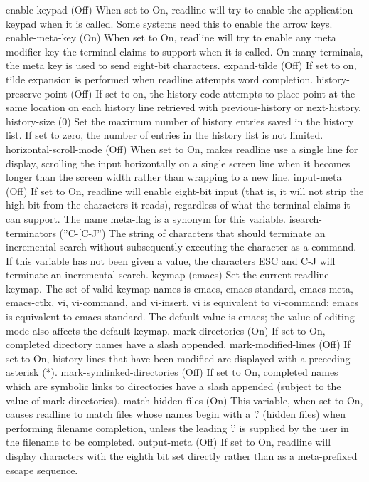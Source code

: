 \documentclass[11pt]{article}
\begin{document}
{{{enable-keypad (Off)
When set to On, readline will try to enable the application keypad when it is called. Some systems need this to enable the arrow keys.
enable-meta-key (On)
When set to On, readline will try to enable any meta modifier key the terminal claims to support when it is called. On many terminals, the meta key is used to send eight-bit characters.
expand-tilde (Off)
If set to on, tilde expansion is performed when readline attempts word completion.
history-preserve-point (Off)
If set to on, the history code attempts to place point at the same location on each history line retrieved with previous-history or next-history.
history-size (0)
Set the maximum number of history entries saved in the history list. If set to zero, the number of entries in the history list is not limited.
horizontal-scroll-mode (Off)
When set to On, makes readline use a single line for display, scrolling the input horizontally on a single screen line when it becomes longer than the screen width rather than wrapping to a new line.
input-meta (Off)
If set to On, readline will enable eight-bit input (that is, it will not strip the high bit from the characters it reads), regardless of what the terminal claims it can support. The name meta-flag is a synonym for this variable.
isearch-terminators (''C-[C-J'')
The string of characters that should terminate an incremental search without subsequently executing the character as a command. If this variable has not been given a value, the characters ESC and C-J will terminate an incremental search.
keymap (emacs)
Set the current readline keymap. The set of valid keymap names is emacs, emacs-standard, emacs-meta, emacs-ctlx, vi, vi-command, and vi-insert. vi is equivalent to vi-command; emacs is equivalent to emacs-standard. The default value is emacs; the value of editing-mode also affects the default keymap.
mark-directories (On)
If set to On, completed directory names have a slash appended.
mark-modified-lines (Off)
If set to On, history lines that have been modified are displayed with a preceding asterisk (*).
mark-symlinked-directories (Off)
If set to On, completed names which are symbolic links to directories have a slash appended (subject to the value of mark-directories).
match-hidden-files (On)
This variable, when set to On, causes readline to match files whose names begin with a '.' (hidden files) when performing filename completion, unless the leading '.' is supplied by the user in the filename to be completed.
output-meta (Off)
If set to On, readline will display characters with the eighth bit set directly rather than as a meta-prefixed escape sequence.
}}}
\end{document}
